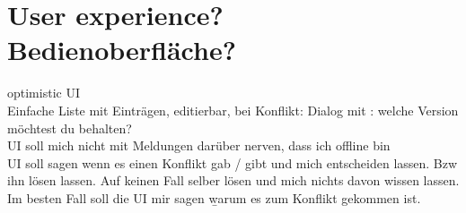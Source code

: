 \section{User experience? Bedienoberfläche?}
\Gls{optimistic UI}\\
Einfache Liste mit Einträgen, editierbar, bei Konflikt: Dialog mit : welche Version möchtest du behalten?\\
\gls{UI} soll mich nicht mit Meldungen darüber nerven, dass ich offline bin\\
\gls{UI} soll sagen wenn es einen Konflikt gab / gibt und mich entscheiden lassen. Bzw ihn lösen lassen.
Auf keinen Fall selber lösen und mich nichts davon wissen lassen.\\
Im besten Fall soll die \gls{UI} mir sagen \b{warum} es zum Konflikt gekommen ist.
